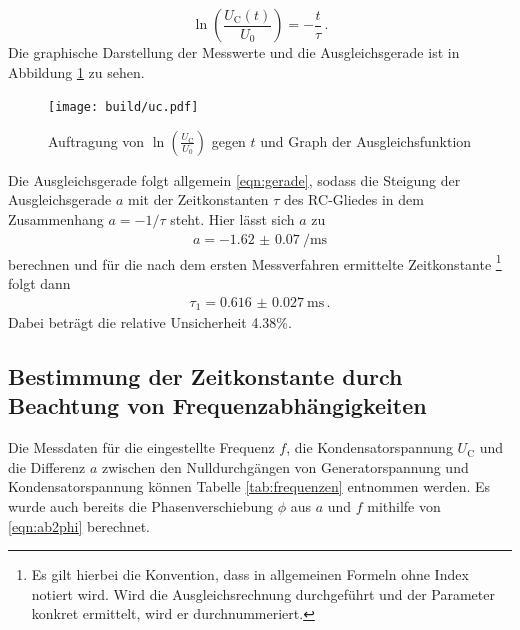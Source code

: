 \begin{equation}
  \ln{\left(\frac{U_\mathrm{C}(t)}{U_0}\right)} = -\frac{t}{\tau}\,.
\end{equation}
Die graphische Darstellung der Messwerte und die Ausgleichsgerade ist in Abbildung \ref{fig:entladung}
zu sehen.
\begin{figure}
  \centering
  \texttt{[image: build/uc.pdf]}
  \caption{Auftragung von $\ln{\left(\frac{U_\mathrm{C}}{U_0}\right)}$ gegen $t$ und Graph der Ausgleichsfunktion}
  \label{fig:entladung}
\end{figure}
Die Ausgleichsgerade folgt allgemein \eqref{eqn:gerade}, sodass die Steigung der
Ausgleichsgerade $a$ mit der Zeitkonstanten $\tau$ des RC-Gliedes in dem Zusammenhang
$a = -1/\tau$ steht. Hier lässt sich $a$ zu
\begin{align}
  a = \SI{-1.62(007)}{\per\milli\second}
\end{align}
berechnen und für die nach dem ersten Messverfahren ermittelte Zeitkonstante
\footnote{Es gilt hierbei die Konvention, dass in allgemeinen Formeln \tau ohne
Index notiert wird. Wird die Ausgleichsrechnung durchgeführt und der Parameter
konkret ermittelt, wird er durchnummeriert.}
folgt dann
\begin{align}
\tau_1 = \SI{0.616(0027)}{\milli\second}\,.
\end{align}
Dabei beträgt die relative Unsicherheit 4.38\%.
\subsection{Bestimmung der Zeitkonstante durch Beachtung von Frequenzabhängigkeiten}

Die Messdaten für die eingestellte Frequenz $f$, die Kondensatorspannung
$U_\text{C}$ und die Differenz $a$ zwischen den Nulldurchgängen von Generatorspannung
und Kondensatorspannung können Tabelle \ref{tab:frequenzen} entnommen werden. Es wurde auch bereits
die Phasenverschiebung $\phi$ aus $a$ und $f$ mithilfe von \eqref{eqn:ab2phi} berechnet.

